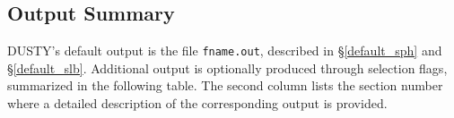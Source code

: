 \documentclass[11pt]{article}
\def\D  {{\sf DUSTY}}
\begin{document}
\newpage

\begin{appendix}


\section{Output Summary}
\label{summary}

\D's default output is the file {\tt fname.out}, described in
\S\ref{default_sph} and \S\ref{default_slb}. Additional output is optionally
produced through selection flags, summarized in the following table.  The
second column lists the section number where a detailed description of the
corresponding output is provided.

\begin{table}[htbp]
\begin{center}
\renewcommand{\arraystretch}{1.3}


\end{center}
\end{table}
\end{appendix}
\end{document}
